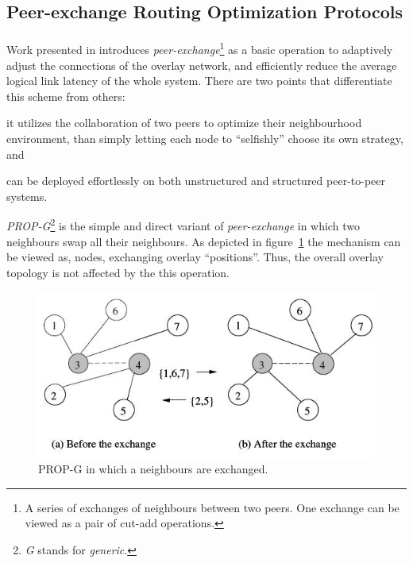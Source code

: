 \documentclass[a4paper,10pt]{article}
\begin{document}
\subsection{Peer-exchange Routing Optimization Protocols}

\paragraph{}
Work presented in \cite{qiu_prop_2007} introduces \emph{peer-exchange}\footnote{A series of exchanges of neighbours between two peers. One exchange can be viewed as a pair of cut-add operations.} as a basic operation to adaptively adjust the connections of the overlay network, and efficiently reduce the average logical link latency of the whole system. There are two points that differentiate this scheme from others:
\begin{inparaenum}
  \item it utilizes the collaboration of two peers to optimize their neighbourhood environment, than simply letting each node to ``selfishly'' choose its own strategy, and
  \item can be deployed effortlessly on both unstructured and structured peer-to-peer systems.
\end{inparaenum}

\emph{PROP-G}\footnote{\emph{G} stands for \emph{generic}.} is the simple and direct variant of \emph{peer-exchange} in which two neighbours swap all their neighbours. As depicted in figure~\ref{figure:prop-g} the mechanism can be viewed as, nodes, exchanging overlay ``positions''. Thus, the overall overlay topology is not affected by the this operation.

\begin{figure}
\centering
  \includegraphics[scale=0.4]{img/prop-g.jpeg}
\caption{PROP-G in which a neighbours are exchanged.}
\label{figure:prop-g}
\end{figure}
\end{document}
